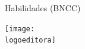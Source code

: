 \documentclass[smaller,professionalfonts,15pt]{beamer}
\begin{document}
\begin{frame}[plain]{Habilidades (BNCC)}
\vspace{-2cm}
\end{frame}


\begin{frame}
\centering\hfill\texttt{[image: \\logoeditora]}
\end{frame}
\end{document}
